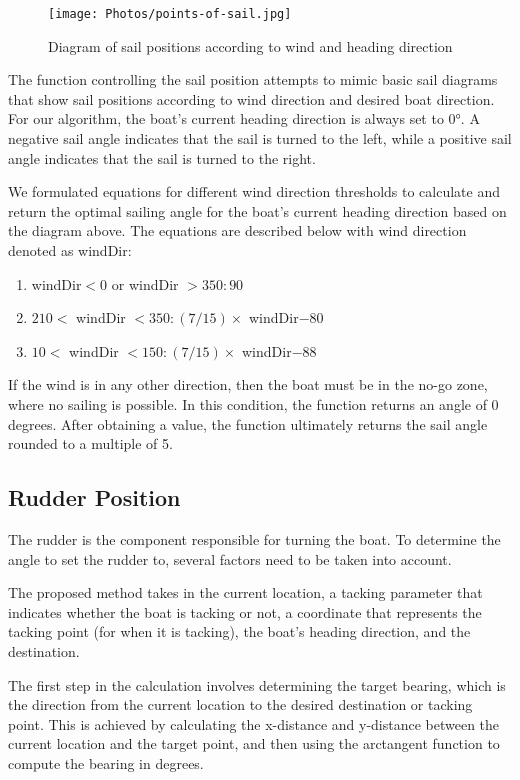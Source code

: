 \documentclass{article}
\begin{document}
\begin{figure}[h]
    \centering
    \texttt{[image: Photos/points-of-sail.jpg]}
    \caption{Diagram of sail positions according to wind and heading direction}
    \label{fig: Photos/electrical_blockRS422.png}
\end{figure}

The function controlling the sail position attempts to mimic basic sail diagrams that show sail positions according to wind direction and desired boat direction. For our algorithm, the boat's current heading direction is always set to 0°. A negative sail angle indicates that the sail is turned to the left, while a positive sail angle indicates that the sail is turned to the right.

We formulated equations for different wind direction thresholds to calculate and return the optimal sailing angle for the boat's current heading direction based on the diagram above. The equations are described below with wind direction denoted as windDir:

\begin{enumerate}
\item windDir$<0$ or windDir $> 350: 90$
\item $210<$ windDir $<350: (7/15) \times$ windDir$-80 $
\item $10 <$ windDir $< 150: (7/15) \times$ windDir$- 88 $
\end{enumerate}

If the wind is in any other direction, then the boat must be in the no-go zone, where no sailing is possible. In this condition, the function returns an angle of 0 degrees. After obtaining a value, the function ultimately returns the sail angle rounded to a multiple of 5.

\subsection{Rudder Position}
The rudder is the component responsible for turning the boat. To determine the angle to set the rudder to, several factors need to be taken into account. 

The proposed method takes in the current location, a tacking parameter that indicates whether the boat is tacking or not, a coordinate that represents the tacking point (for when it is tacking), the boat's heading direction, and the destination. 

The first step in the calculation involves determining the target bearing, which is the direction from the current location to the desired destination or tacking point. This is achieved by calculating the x-distance and y-distance between the current location and the target point, and then using the arctangent function to compute the bearing in degrees.
\end{document}
